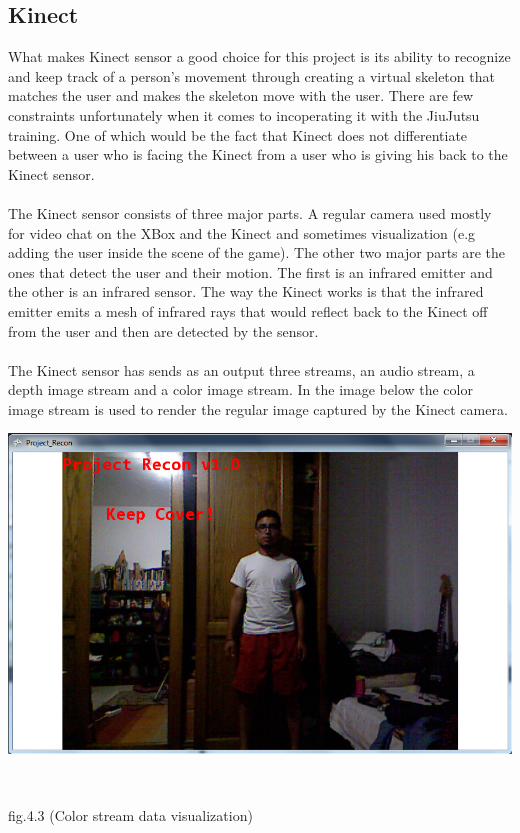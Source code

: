 \documentclass[11pt]{article} %
\begin{document}
\subsection{Kinect}
What makes Kinect sensor a good choice for this project is its ability to recognize and keep track of a person's movement through creating a virtual skeleton that matches the user and makes the skeleton move with the user. There are few constraints unfortunately when it comes to incoperating it with the JiuJutsu training. One of which would be the fact that Kinect does not differentiate between a user who is facing the Kinect from a user who is giving his back to the Kinect sensor. 
\\
\\
The Kinect sensor consists of three major parts. A regular camera used mostly for video chat on the XBox and the Kinect and sometimes visualization (e.g adding the user inside the scene of the game). The other two major parts are the ones that detect the user and their motion. The first is an infrared emitter and the other is an infrared sensor. The way the Kinect works is that the infrared emitter emits a mesh of infrared rays that would reflect back to the Kinect off from the user and then are detected by the sensor.
\\
\\
The Kinect sensor has sends as an output three streams, an audio stream, a depth image stream and a color image stream. In the image below the color image stream is used to render the regular image captured by the Kinect camera.
\\
\centerline{\includegraphics[scale=0.5]{color_data.png}}
\\
\centerline{fig.4.3 (Color stream data visualization)}
\\
\end{document}
